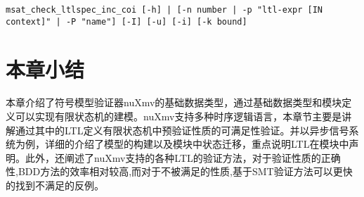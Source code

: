 \begin{lstlisting}
msat_check_ltlspec_inc_coi [-h] | [-n number | -p "ltl-expr [IN context]" | -P "name"] [-I] [-u] [-i] [-k bound]
\end{lstlisting}


\section{本章小结}
本章介绍了符号模型验证器nuXmv的基础数据类型，通过基础数据类型和模块定义可以实现有限状态机的建模。nuXmv支持多种时序逻辑语言，本章节主要是讲解通过其中的LTL定义有限状态机中预验证性质的可满足性验证。并以异步信号系统为例，详细的介绍了模型的构建以及模块中状态迁移，重点说明LTL在模块中声明。此外，还阐述了nuXmv支持的各种LTL的验证方法，对于验证性质的正确性,BDD方法的效率相对较高,而对于不被满足的性质,基于SMT验证方法可以更快的找到不满足的反例。

